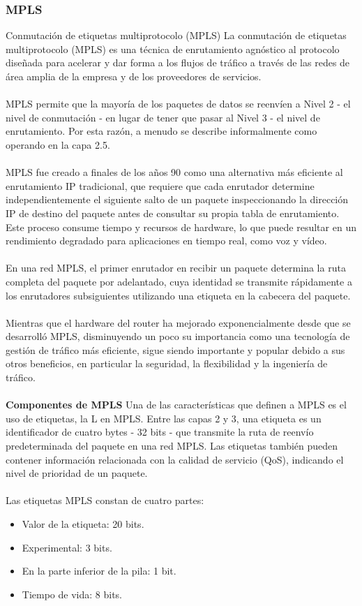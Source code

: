\documentclass[12pt,letterpaper]{article}
\begin{document}
\subsubsection{MPLS}
Conmutación de etiquetas multiprotocolo (MPLS)
La conmutación de etiquetas multiprotocolo (MPLS) es una técnica de enrutamiento agnóstico 
al protocolo diseñada para acelerar y dar forma a los flujos de tráfico a través de las 
redes de área amplia de la empresa y de los proveedores de servicios.
\\ \\
MPLS permite que la mayoría de los paquetes de datos se reenvíen a Nivel 2 - el nivel 
de conmutación - en lugar de tener que pasar al Nivel 3 - el nivel de enrutamiento. Por 
esta razón, a menudo se describe informalmente como operando en la capa 2.5.
\\ \\
MPLS fue creado a finales de los años 90 como una alternativa más eficiente al 
enrutamiento IP tradicional, que requiere que cada enrutador determine independientemente 
el siguiente salto de un paquete inspeccionando la dirección IP de destino del paquete 
antes de consultar su propia tabla de enrutamiento. Este proceso consume tiempo y 
recursos de hardware, lo que puede resultar en un rendimiento degradado para aplicaciones 
en tiempo real, como voz y vídeo.
\\ \\
En una red MPLS, el primer enrutador en recibir un paquete determina la ruta completa 
del paquete por adelantado, cuya identidad se transmite rápidamente a los enrutadores 
subsiguientes utilizando una etiqueta en la cabecera del paquete.
\\ \\
Mientras que el hardware del router ha mejorado exponencialmente desde que se desarrolló 
MPLS, disminuyendo un poco su importancia como una tecnología de gestión de tráfico más 
eficiente, sigue siendo importante y popular debido a sus otros beneficios, en particular 
la seguridad, la flexibilidad y la ingeniería de tráfico. 
\\ \\
\textbf{Componentes de MPLS}
\newline
Una de las características que definen a MPLS es el uso de etiquetas, la L en MPLS. 
Entre las capas 2 y 3, una etiqueta es un identificador de cuatro bytes - 32 bits - 
que transmite la ruta de reenvío predeterminada del paquete en una red MPLS. Las 
etiquetas también pueden contener información relacionada con la calidad de 
servicio (QoS), indicando el nivel de prioridad de un paquete.
\\ \\
Las etiquetas MPLS constan de cuatro partes:
\begin{itemize}
    \item Valor de la etiqueta: 20 bits.
    \item Experimental: 3 bits.
    \item En la parte inferior de la pila: 1 bit.
    \item Tiempo de vida: 8 bits.
\end{itemize}
\end{document}
